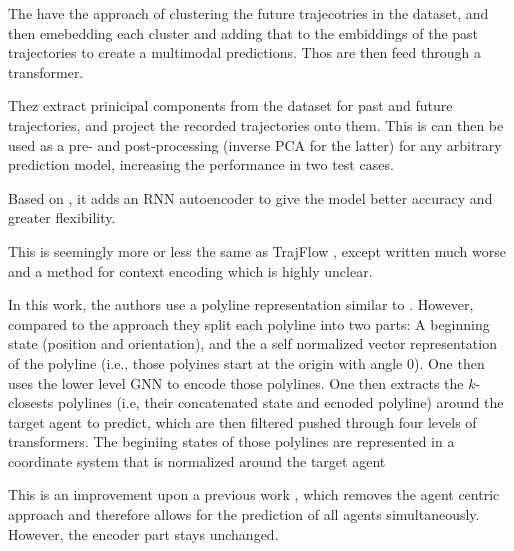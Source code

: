 
\cite{shi2023trajectory} The have the approach of clustering the future trajecotries in the dataset, and then emebedding each cluster and adding that to the embiddings of the past trajectories to create a multimodal predictions. Thos are then feed through a transformer.


\cite{bae2023eigentrajectory} Thez extract prinicipal components from the dataset for past and future trajectories, and project the recorded trajectories onto them. This is can then be used as a pre- and post-processing (inverse PCA for the latter) for any arbitrary prediction model, increasing the performance in two test cases.


\cite{meszaros2024trajflow} Based on \cite{scholler2021flomo}, it adds an RNN autoencoder to give the model better accuracy and greater flexibility.


\cite{stefani2024mapflow} This is seemingly more or less the same as TrajFlow \cite{meszaros2024trajflow}, except written much worse and a method for context encoding which is highly unclear.



\cite{tang2024hpnet} 



\cite{zhang2024real} In this work, the authors use a polyline representation similar to \cite{gao2020vectornet}. However, compared to the approach they split each polyline into two parts: A beginning state (position and orientation), and the a self normalized vector representation of the polyline (i.e., those polyines start at the origin with angle 0). One then uses the lower level GNN to encode those polylines. One then extracts the $k$-closests polylines (i.e, their concatenated state and ecnoded polyline) around the target agent to predict, which are then filtered pushed through four levels of transformers. The beginiing states of those polylines are represented in a coordinate system that is normalized around the target agent



\cite{shi2024mtr} This is an improvement upon a previous work \cite{shi2022motion}, which removes the agent centric approach and therefore allows for the prediction of all agents simultaneously. However, the encoder part stays unchanged.